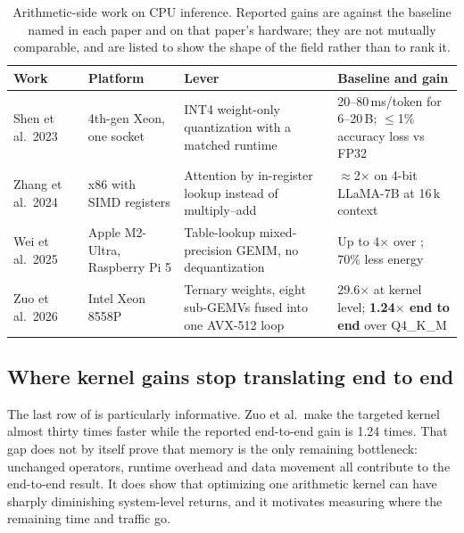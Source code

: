 \begin{table}[htbp]
\centering
\small
\tabsetup
\caption{Arithmetic-side work on CPU inference.  Reported gains are
against the baseline named in each paper and on that paper's hardware;
they are not mutually comparable, and are listed to show the shape of
the field rather than to rank it.}
\label{tab:lit-arithmetic}
\begin{tabularx}{\textwidth}{@{}P{2.5cm}P{3.1cm}YP{3.1cm}@{}}
\toprule
\headrow
\textbf{Work} & \textbf{Platform} & \textbf{Lever} &
\textbf{Baseline and gain} \\
\midrule
Shen et al.\ 2023~\cite{shen2023efficientcpu}
& 4th-gen Xeon, one socket
& INT4 weight-only quantization with a matched runtime
& 20--80\,ms/token for 6--20\,B; \(\leq\)1\% accuracy loss vs FP32 \\
\addlinespace[2pt]
Zhang et al.\ 2024~\cite{zhang2024nomad}
& x86 with SIMD registers
& Attention by in-register lookup instead of multiply--add
& \(\approx\)2$\times$ on 4-bit LLaMA-7B at 16\,k context \\
\addlinespace[2pt]
Wei et al.\ 2025~\cite{wei2025tmac}
& Apple M2-Ultra, Raspberry Pi 5
& Table-lookup mixed-precision GEMM, no dequantization
& Up to 4$\times$ over \lcpp{}; 70\% less energy \\
\addlinespace[2pt]
Zuo et al.\ 2026~\cite{zuo2026fairyfuse}
& Intel Xeon 8558P
& Ternary weights, eight sub-GEMVs fused into one AVX-512 loop
& 29.6$\times$ at kernel level; \textbf{1.24$\times$ end to end} over
  \lcpp{} Q4\_K\_M \\
\bottomrule
\end{tabularx}
\end{table}

\subsection{Where kernel gains stop translating end to end}
\label{sec:lit-pivot}

The last row of  is particularly informative.
Zuo et al.\ make the targeted kernel almost thirty times faster while the
reported end-to-end gain is 1.24 times.  That gap does not by itself prove
that memory is the only remaining bottleneck: unchanged operators,
runtime overhead and data movement all contribute to the end-to-end
result.  It does show that optimizing one arithmetic kernel can have
sharply diminishing system-level returns, and it motivates measuring
where the remaining time and traffic go.

